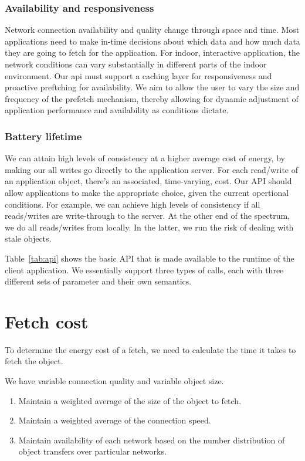 \subsubsection{Availability and responsiveness}
Network connection availability and quality change through space and time. Most applications need to make in-time decisions about which
data and how much data they are going to fetch for the application.  For indoor, interactive application, the network conditions can
vary substantially in different parts of the indoor environment.  Our api must support a caching layer for responsiveness and
proactive preftching for availability.  We aim to allow the user to vary the size and frequency of the prefetch mechanism, thereby
allowing for dynamic adjustment of application performance and availability as conditions dictate.

\subsubsection{Battery lifetime}
We can attain high levels of consistency at a higher average cost of energy, by making our all writes go directly to the application server.
For each read/write of an application object, there's an associated, time-varying, cost.  Our API should allow applications to make the 
appropriate choice, given the current opertional conditions.  For example, we can achieve high levels of consistency if all reads/writes are
write-through to the server.  At the other end of the spectrum, we do all reads/writes from locally.  In the latter, we run the risk
of dealing with stale objects.

Table~\ref{tab:api} shows the basic API that is made available to the runtime of the client application.  We essentially support three
types of calls, each with three different sets of parameter and their own semantics.

\section{Fetch cost}
To determine the energy cost of a fetch, we need to calculate the time it takes to fetch the object.  

We have variable connection quality and variable object size.

\begin{enumerate}
\item Maintain a weighted average of the size of the object to fetch.
\item Maintain a weighted average of the connection speed.
\item Maintain availability of each network based on the number distribution of object transfers over particular networks.	
\end{enumerate}


